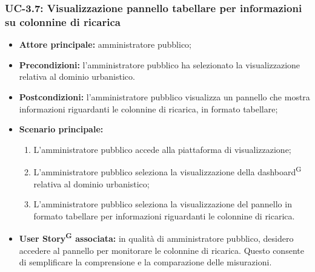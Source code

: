 \documentclass[8pt]{article}
\newcommand{\glossterm}[1]{#1\textsuperscript{G}} %
\begin{document}
\subsubsection*{UC-3.7: Visualizzazione pannello tabellare per informazioni su colonnine di ricarica}
\begin{itemize}
    \item \textbf{Attore principale:} amministratore pubblico;
    \item \textbf{Precondizioni:} l'amministratore pubblico ha selezionato la visualizzazione
        relativa al dominio urbanistico.
    \item \textbf{Postcondizioni:} l'amministratore pubblico visualizza un pannello che mostra informazioni riguardanti le colonnine di ricarica, in formato tabellare;
    \item \textbf{Scenario principale:} 
    \begin{enumerate}
    \item L'amministratore pubblico accede alla piattaforma di visualizzazione;
    \item L'amministratore pubblico seleziona la visualizzazione della \glossterm{dashboard} relativa al dominio urbanistico;
    \item L'amministratore pubblico seleziona la visualizzazione del pannello in formato tabellare per informazioni riguardanti le colonnine di ricarica.
    \end{enumerate}
    \item \textbf{\glossterm{User Story} associata:} in qualità di amministratore pubblico, desidero accedere al pannello per monitorare le colonnine di ricarica. Questo consente di semplificare la comprensione e la comparazione delle misurazioni.
\end{itemize}
\end{document}

